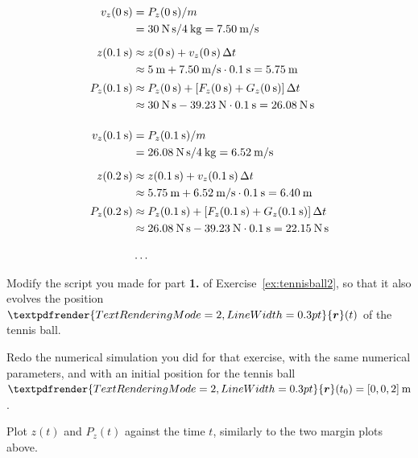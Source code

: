 \documentclass[a4paper,12pt,%
onecolumn,oneside,titlepage,%
british%
]{memoir}
\renewcommand*{\bm}[1]{\textpdfrender{TextRenderingMode=2,LineWidth=0.3pt}{\boldsymbol{#1}}}
\newcommand*{\incr}{\Delta}%
\renewcommand*{\|}[1][]{\nonscript\:#1\vert\nonscript\:\mathopen{}}
\newcommand*{\yr}{\bm{r}}
\newcommand*{\yM}{m}%
\newcommand*{\yti}{t_{0}}
\newcommand*{\Dt}{\incr t}
\begin{document}
\begin{equation*}
  \begin{aligned}
    v_{z}(\qty{0}{s}) &= P_{z}(\qty{0}{s})/\yM\\
    &=\qty{30}{N\,s}/\qty{4}{kg} = \qty{7.50}{m/s}
    \\[2\jot]
    z(\qty{0.1}{s})  &\approx z(\qty{0}{s}) + v_{z}(\qty{0}{s})\,\Dt\\
    &\approx \qty{5}{m} + \qty{7.50}{m/s}\cdot\qty{0.1}{s} = \qty{5.75}{m}
    \\[0.5\jot]
    P_{z}(\qty{0.1}{s})  &\approx P_{z}(\qty{0}{s}) + [F_{z}(\qty{0}{s}) + G_{z}(\qty{0}{s})]\,\Dt \\
    &\approx\qty{30}{N\,s} -\qty{39.23}{N}\cdot\qty{0.1}{s} = \qty{26.08}{N\,s}
    \\[4\jot]
    v_{z}(\qty{0.1}{s}) &= P_{z}(\qty{0.1}{s})/\yM\\
    &=\qty{26.08}{N\,s}/\qty{4}{kg} = \qty{6.52}{m/s}
    \\[2\jot]
    z(\qty{0.2}{s})  &\approx z(\qty{0.1}{s}) + v_{z}(\qty{0.1}{s})\,\Dt\\
    &\approx \qty{5.75}{m} + \qty{6.52}{m/s}\cdot\qty{0.1}{s} = \qty{6.40}{m}
    \\[0.5\jot]
    P_{z}(\qty{0.2}{s})  &\approx P_{z}(\qty{0.1}{s}) + [F_{z}(\qty{0.1}{s}) + G_{z}(\qty{0.1}{s})]\,\Dt\\
    &\approx\qty{26.08}{N\,s} -\qty{39.23}{N}\cdot\qty{0.1}{s} = \qty{22.15}{N\,s}
    \\[3\jot]
    &\dotso
  \end{aligned}
\end{equation*}

\begin{exercise}[label={ex:tennisball3}]
  Modify the script you made for part \textbf{1.} of Exercise~\ref{ex:tennisball2}, so that it also evolves the position $\yr(t)$ of the tennis ball.

  Redo the numerical simulation you did for that exercise, with the same numerical parameters, and with an initial position for the tennis ball $\yr(\yti) = [0,0,2]\:\unit{m}$.

  Plot $z(t)$ and $P_{z}(t)$ against the time $t$, similarly to the two margin plots above.
\end{exercise}
\end{document}
